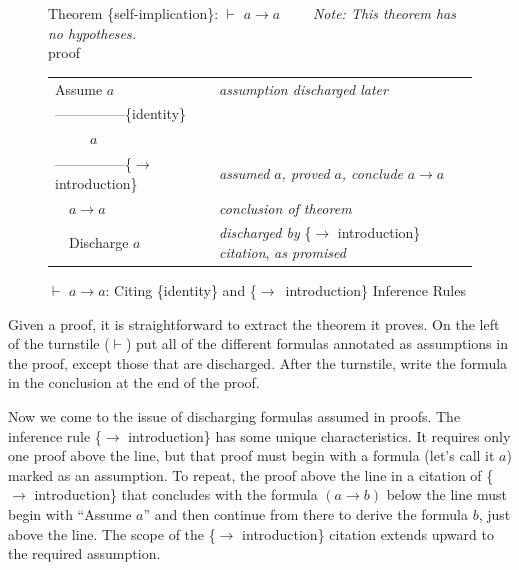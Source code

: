 {\begin{figure}
Theorem \{self-implication\}: $\vdash$ $a \rightarrow a$ ~~~~\emph{Note: This theorem has no hypotheses.}\\
proof
\begin{center}
\begin{tabular}{ll}
Assume $a$                  &\emph{assumption discharged later}\\
---------------\{identity\} &\\
~~~~~$a$                    &\\
---------------\{$\rightarrow$ introduction\} &\emph{assumed} $a$\emph{, proved} $a$\emph{, conclude} $a \rightarrow a$\\
~~$a \rightarrow a$         &\emph{conclusion of theorem}\\
~~Discharge $a$             &\emph{discharged by} \{$\rightarrow$ introduction\} \emph{citation}, \emph{as promised}\\
\end{tabular}
\end{center}
\caption{$\vdash$ $a \rightarrow a$: Citing  \{identity\} and \{$\rightarrow$\ introduction\} Inference Rules}
\label{fig:or-self-imp-proof}
\end{figure}

Given a proof, it is straightforward to extract
the theorem it proves.
On the left of the turnstile ($\vdash$) put all of the different
formulas annotated as assumptions in the proof,
except those that are discharged.
After the turnstile, write the formula in the
conclusion at the end of the proof.

Now we come to the issue of discharging formulas
assumed in proofs.
The inference rule \{$\rightarrow$ introduction\}
has some unique characteristics.
It requires only one proof above the line,
but that proof must begin with a formula
(let's call it $a$)
marked as an assumption.
To repeat, the proof above the line in a citation of
\{$\rightarrow$ introduction\} that
concludes with the formula $(a \rightarrow b)$
below the line
must begin with ``Assume $a$'' and
then continue from there to derive the formula $b$, just above the line.
The scope of the \{$\rightarrow$ introduction\} citation
extends upward to the required assumption.

}
